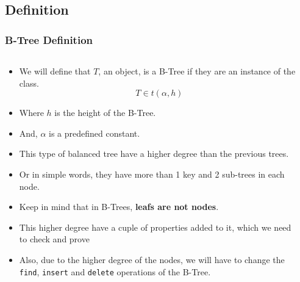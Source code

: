 \documentclass{beamer}
\begin{document}
\begin{frame}
    \subsection{Definition}
    \frametitle{B-Tree Definition}
    \begin{columns}
        \begin{column}{\textlecolumn}
            \begin{block}{}
                \begin{itemize}
                    \item We will define that \(T\), an object, is a B-Tree if they are an instance of the class.
                    \[
                        T \in t\left(\alpha, h\right)
                    \]
                    \item Where \(h\) is the height of the B-Tree.
                    \item And, \(\alpha\) is a predefined constant.
                    \item This type of balanced tree have a higher degree than the previous trees.
                    \item Or in simple words, they have more than 1 key and 2 sub-trees in each node.
                    \item Keep in mind that in B-Trees, \textbf{leafs are not nodes}.
                    \item This higher degree have a cuple of properties added to it, which we need to check and prove
                    \item Also, due to the higher degree of the nodes, we will have to change the 
                        \lstinline|find|, \lstinline|insert| and \lstinline|delete| operations of the B-Tree.
                \end{itemize}
            \end{block}
        \end{column}
        \begin{column}{\textricolumn}
        \end{column}
    \end{columns}
    

\end{frame}
\end{document}
